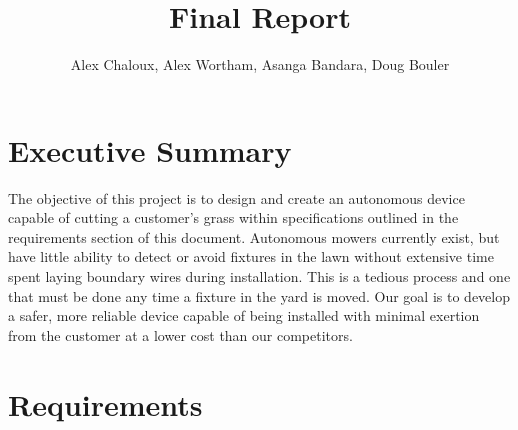 \documentclass[12pt,letterpaper]{article}
\author{Alex Chaloux, Alex Wortham, Asanga Bandara, Doug Bouler}
\title{Final Report}
\begin{document}
\reqstitlepage
{}

\tableofcontents
\clearpage

\section{Executive Summary}


The objective of this project is to design and create an autonomous device capable of cutting a customer’s grass within specifications outlined in the requirements section of this document. Autonomous mowers currently exist, but have little ability to detect or avoid fixtures in the lawn without extensive time spent laying boundary wires during installation. This is a tedious process and one that must be done any time a fixture in the yard is moved. Our goal is to develop a safer, more reliable device capable of being installed with minimal exertion from the customer at a lower cost than our competitors. 

\section{Requirements}
\end{document}
